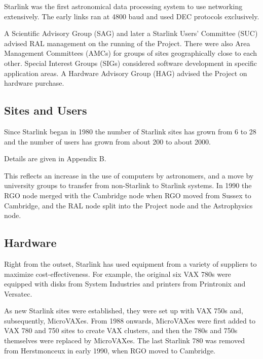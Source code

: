 Starlink was the first astronomical data processing system to use networking
extensively.
The early links ran at 4800 baud and used DEC protocols exclusively.

A Scientific Advisory Group (SAG) and later a Starlink Users' Committee (SUC)
advised RAL management on the running of the Project.
There were also Area Management Committees (AMCs) for groups of sites
geographically close to each other.
Special Interest Groups (SIGs) considered software development in specific
application areas.
A Hardware Advisory Group (HAG) advised the Project on hardware purchase.

\subsection*{Sites and Users}

Since Starlink began in 1980 the number of Starlink sites has grown from 6
to 28 and the number of users has grown from about 200 to about 2000.
\begin{latexonly}
Details are given in Appendix B.
\end{latexonly}
This reflects an increase in the use of computers by astronomers, and a
move by university groups to transfer from non-Starlink to Starlink systems.
In 1990 the RGO node merged with the Cambridge node when RGO moved from
Sussex to Cambridge, and the RAL node split into the Project node and the
Astrophysics node.

\subsection*{Hardware}

Right from the outset, Starlink has used equipment from a variety of suppliers
to maximize cost-effectiveness.
For example, the original six VAX 780s were equipped with disks from System
Industries and printers from Printronix and Versatec.
 
As new Starlink sites were established, they were set up with VAX 750s and,
subsequently, MicroVAXes.
From 1988 onwards, MicroVAXes were first added to VAX 780 and 750 sites to
create VAX clusters, and then the 780s and 750s themselves were replaced by
MicroVAXes.
The last Starlink 780 was removed from Herstmonceux in early 1990, when RGO
moved to Cambridge.
 
